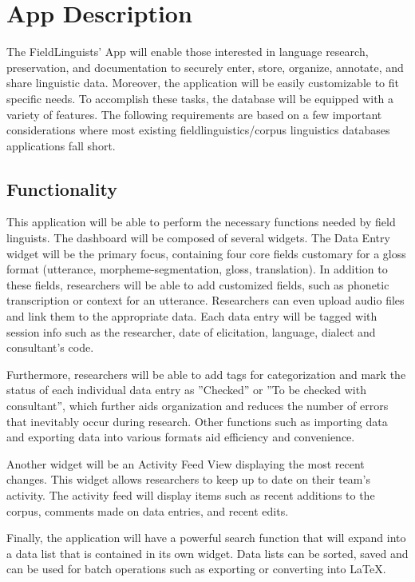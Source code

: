 \documentclass[12 pt]{article}
\begin{document}
\section {App Description}

The FieldLinguists' App will enable those interested in language research, preservation, and documentation to securely enter, store, organize, annotate, and share linguistic data. Moreover, the application will be easily customizable to fit specific needs. To accomplish these tasks, the database will be equipped with a variety of features. 
The following requirements are based on a few important considerations where most existing fieldlinguistics/corpus linguistics databases applications fall short. 


\subsection{Functionality}

This application will be able to perform the necessary functions needed by field linguists. The dashboard will be composed of several widgets. The Data Entry widget will be the primary focus, containing four core fields customary for a gloss format (utterance, morpheme-segmentation, gloss, translation). In addition to these fields, researchers will be able to add customized fields, such as phonetic transcription or context for an utterance.  Researchers can even upload audio files and link them to the appropriate data. Each data entry will be tagged with session info such as the researcher, date of elicitation, language, dialect and consultant's code. 

Furthermore, researchers will be able to add tags for categorization and mark the status of each individual data entry as ''Checked'' or ''To be checked with consultant'', which further aids organization and reduces the number of errors that inevitably occur during research. Other functions such as importing data and exporting data into various formats aid efficiency and convenience. 

Another widget will be an Activity Feed View displaying the most recent changes. This widget allows researchers to keep up to date on their team's activity.  The activity feed will display items such as recent additions to the corpus, comments made on data entries, and recent edits. 

Finally, the application will have a powerful search function that will expand into a data list that is contained in its own widget. Data lists can be sorted, saved and can be used for batch operations such as exporting or converting into LaTeX. 
\end{document}
